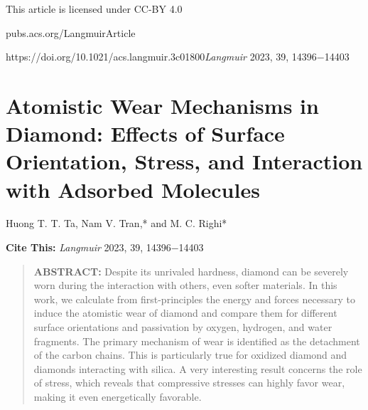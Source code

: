 \documentclass{article}
\begin{document}

\noindent This article is licensed under CC-BY 4.0\par
\noindent pubs.acs.org/Langmuir\quad Article\par
\noindent https://doi.org/10.1021/acs.langmuir.3c01800\quad \textit{Langmuir} 2023, 39, 14396−14403\par

\section*{Atomistic Wear Mechanisms in Diamond: Effects of Surface Orientation, Stress, and Interaction with Adsorbed Molecules}

\noindent Huong T. T. Ta, Nam V. Tran,* and M. C. Righi*

\noindent\textbf{Cite This:} \textit{Langmuir} 2023, 39, 14396−14403

\begin{quote}
\textbf{ABSTRACT:} Despite its unrivaled hardness, diamond can be severely worn during the interaction with others, even softer materials. In this work, we calculate from first-principles the energy and forces necessary to induce the atomistic wear of diamond and compare them for different surface orientations and passivation by oxygen, hydrogen, and water fragments. The primary mechanism of wear is identified as the detachment of the carbon chains. This is particularly true for oxidized diamond and diamonds interacting with silica. A very interesting result concerns the role of stress, which reveals that compressive stresses can highly favor wear, making it even energetically favorable.
\end{quote}
\end{document}
